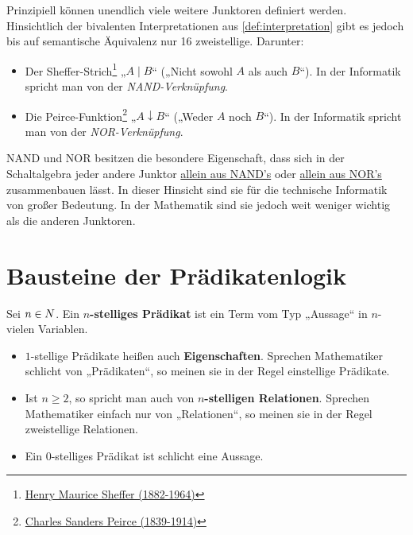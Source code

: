 	
\begin{vorschau}
    Prinzipiell können unendlich viele weitere Junktoren definiert werden. Hinsichtlich der bivalenten Interpretationen aus \cref{def:interpretation} gibt es jedoch bis auf semantische Äquivalenz nur 16 zweistellige. Darunter:
    \begin{itemize}
        \item Der Sheffer-Strich\footnote{\href{https://de.wikipedia.org/wiki/Henry_Maurice_Sheffer}{Henry Maurice Sheffer (1882-1964)}} „$A\mid B$“ („Nicht sowohl $A$ als auch $B$“). In der Informatik spricht man von der \emph{NAND-Verknüpfung}.
        \item Die Peirce-Funktion\footnote{\href{https://de.wikipedia.org/wiki/Charles_Sanders_Peirce}{Charles Sanders Peirce (1839-1914)}} „$A\downarrow B$“ („Weder $A$ noch $B$“). In der Informatik spricht man von der \emph{NOR-Verknüpfung}.
    \end{itemize}
    NAND und NOR besitzen die besondere Eigenschaft, dass sich in der Schaltalgebra jeder andere Junktor \href{https://en.wikipedia.org/wiki/NAND_logic}{allein aus NAND's} oder \href{https://en.wikipedia.org/wiki/NOR_logic}{allein aus NOR's} zusammenbauen lässt. In dieser Hinsicht sind sie für die technische Informatik von großer Bedeutung. In der Mathematik sind sie jedoch weit weniger wichtig als die anderen Junktoren.
\end{vorschau}




	
\section{Bausteine der Prädikatenlogik}


\begin{defin}[Prädikat] \label{def:praedikat}  
    Sei $n\in \relax N$. Ein \textbf{$n$-stelliges Prädikat} ist ein Term vom Typ „Aussage“ in $n$-vielen Variablen.
    \begin{itemize}
        \item $1$-stellige Prädikate heißen auch \textbf{Eigenschaften}. Sprechen Mathematiker schlicht von „Prädikaten“, so meinen sie in der Regel einstellige Prädikate.
        \item Ist $n\ge 2$, so spricht man auch von \textbf{$n$-stelligen Relationen}. Sprechen Mathematiker einfach nur von „Relationen“, so meinen sie in der Regel zweistellige Relationen.
        \item Ein $0$-stelliges Prädikat ist schlicht eine Aussage.
    \end{itemize}
\end{defin}


